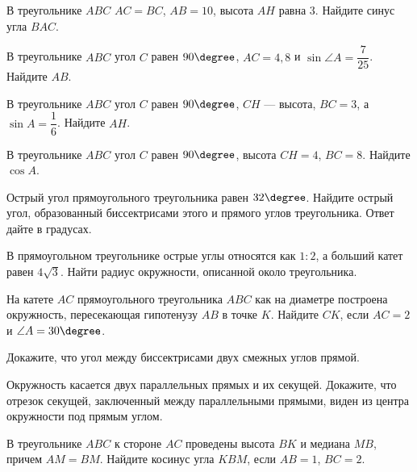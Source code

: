 \begin{class}[number=5]
\begin{listofex}
		\item В треугольнике \( ABC \) \( AC = BC \), \( AB = 10 \), высота \( AH \) равна \( 3 \). Найдите синус угла \( BAC \).
		\item В треугольнике \( ABC \) угол \( C \) равен \( 90\degree \), \( AC=4,8 \) и \( \sin\angle A = \dfrac{7}{25} \). Найдите \( AB \).
		\item В треугольнике \( ABC \) угол \( C \) равен \( 90\degree \), \( CH \) --- высота, \( BC=3 \), а \( \sin A=\dfrac{1}{6} \). Найдите \( AH \).
		\item В треугольнике \( ABC \) угол \( C \) равен \( 90\degree \), высота \( CH=4 \), \( BC=8 \). Найдите \( \cos A \).
		\item Острый угол прямоугольного треугольника равен \( 32\degree \). Найдите острый угол, образованный биссектрисами этого и прямого углов треугольника. Ответ дайте в градусах.
		\item В прямоугольном треугольнике острые углы относятся как \( 1:2 \), а больший
		катет равен \( 4\sqrt{3} \). Найти радиус окружности, описанной около треугольника.
		\item На катете \( AC \) прямоугольного треугольника \( ABC \) как на диаметре построена окружность, пересекающая гипотенузу \( AB \) в точке \( K \). Найдите \( CK \), если \( AC = 2 \) и \( \angle A = 30\degree \).
		\item Докажите, что угол между биссектрисами двух смежных углов прямой.
		\item Окружность касается двух параллельных прямых и их секущей. Докажите, что отрезок секущей, заключенный между параллельными прямыми, виден из центра окружности под
		прямым углом.
		\item В треугольнике \( ABC \) к стороне \( AC \) проведены высота \( BK \) и медиана \( MB \), причем \( AM =BM \). Найдите косинус угла \( KBM \), если \( AB=1 \), \( BC = 2 \).
	\end{listofex}
\end{class}
%
%
%
%	
%
%
%	
%
%
%	
